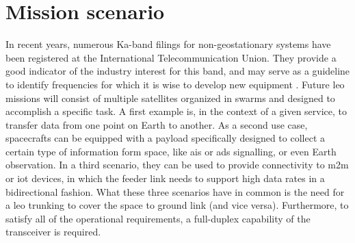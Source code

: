 \documentclass[conference,10pt,a4paper]{IEEEtran}%
\begin{document}
\section{Mission scenario}
\label{sec:mis-sce}
In recent years, numerous Ka-band filings for non-geostationary systems have been registered at the International Telecommunication Union.
They provide a good indicator of the industry interest for this band, and may serve as a guideline to identify frequencies for which it is wise to develop new equipment \cite{ioag2016}.
Future \ac{leo} missions will consist of multiple satellites organized in swarms and designed to accomplish a specific task.
A first example is, in the context of a given service, to transfer data from one point on Earth to another.
As a second use case, spacecrafts can be equipped with a payload specifically designed to collect a certain type of information form space, like \ac{ais} or \ac{ads} signalling, or even Earth observation.
In a third scenario, they can be used to provide connectivity to \ac{m2m} or \ac{iot} devices, in which the feeder link needs to support high data rates in a bidirectional fashion.
What these three scenarios have in common is the need for a \ac{leo} trunking to cover the space to ground link (and vice versa).
Furthermore, to satisfy all of the operational requirements, a full-duplex capability of the transceiver is required.
\end{document}
